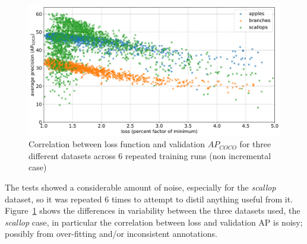 \begin{figure}[h]
  \centering
  \includegraphics[width=1.0\linewidth]{charts/training/lr_schedule/scatter_loss_ap.pdf}
  \caption{Correlation between loss function and validation $AP_{COCO}$ for three different datasets across 6 repeated training runs (non incremental case)}  \label{fig:scatter_loss_ap}
\end{figure}

The tests showed a considerable amount of noise, especially for the \emph{scallop} dataset, so it was repeated 6 times to attempt to distil anything useful from it. Figure~\ref{fig:scatter_loss_ap} shows the differences in variability between the three datasets used, the \emph{scallop} case, in particular the correlation between loss and validation \gls{AP} is noisy; possibly from over-fitting and/or inconsistent annotations.

